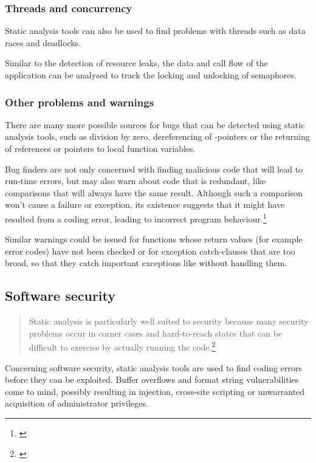 \subsubsection{Threads and concurrency}

Static analysis tools can also be used to find problems with threads such as data races and deadlocks.

Similar to the detection of resource leaks, the data and call flow of the application can be analysed to track the locking and unlocking of semaphores.

\subsubsection{Other problems and warnings}

There are many more possible sources for bugs that can be detected using static analysis tools, such as division by zero, dereferencing of -pointers or the returning of references or pointers to local function variables.

Bug finders are not only concerned with finding malicious code that will lead to run-time errors, but may also warn about code that is redundant, like comparisons that will always have the same result. Although such a comparison won't cause a failure or exception, its existence suggests that it might have resulted from a coding error, leading to incorrect program behaviour.\footnote{\citep[1]{UsingSAToFindBugs}}

Similar warnings could be issued for functions whose return values (for example error codes) have not been checked or for exception catch-clauses that are too broad, so that they catch important exceptions like  without handling them.

\subsection{Software security}

\begin{quotation}
Static analysis is particularly well suited to security because many security problems occur in corner cases and hard-to-reach states that can be difficult to exercise by actually running the code.\footnote{\citep[4]{SecureProgramming}}
\end{quotation}

Concerning software security, static analysis tools are used to find coding errors before they can be exploited. Buffer overflows and format string vulnerabilities come to mind, possibly resulting in  injection, cross-site scripting or unwarranted acquisition of administrator privileges. 

